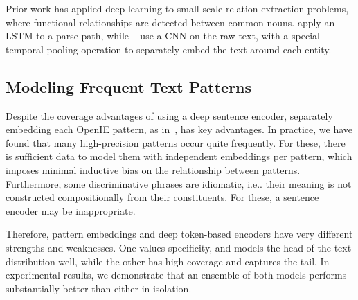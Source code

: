 Prior work has applied deep learning to small-scale relation extraction problems, where functional relationships are detected between common nouns. \citet{xu2015classifying} apply an LSTM to a parse path, while ~\citet{zengdistant} use a CNN on the raw text, with a special temporal pooling operation to separately embed the text around each entity.

\subsection{Modeling Frequent Text Patterns}
\label{sec:non-comp}

Despite the coverage advantages of using a deep sentence encoder, separately embedding each OpenIE pattern, as in~\citet{limin}, has key advantages. In practice, we have found that many high-precision patterns occur quite frequently. For these, there is sufficient data to model them with independent embeddings per pattern, which imposes minimal inductive bias on the relationship between patterns. Furthermore, some discriminative phrases are idiomatic, i.e.. their meaning is not constructed compositionally from their constituents. For these, a sentence encoder may be inappropriate. 

Therefore, pattern embeddings and deep token-based encoders have very different strengths and weaknesses. One values specificity, and models the head of the text distribution well, while the other has high coverage and captures the tail. In experimental results, we demonstrate that an ensemble of both models performs substantially better than either in isolation.




